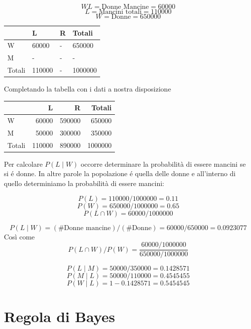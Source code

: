 \documentclass[onecolumn,12pt]{book}\usepackage[]{graphicx}\usepackage[]{color}
\newenvironment{knitrout}{}{} %
\begin{document}
$$WL =\textrm{Donne Mancine}=60000$$
$$L=\textrm{Mancini totali}= 110000$$
$$W=\textrm{Donne}= 650000$$
\begin{center}
\begin{knitrout}
\color{fgcolor}
\begin{tabular}{l|l|l|l}
\hline
  & L & R & Totali\\
\hline
W & 60000 & - & 650000\\
\hline
M & - & - & -\\
\hline
Totali & 110000 & - & 1000000\\
\hline
\end{tabular}


\end{knitrout}
\end{center}
Completando la tabella con i dati a nostra disposizione

\begin{center}
\begin{knitrout}
\color{fgcolor}
\begin{tabular}{l|r|r|r}
\hline
  & L & R & Totali\\
\hline
W & 60000 & 590000 & 650000\\
\hline
M & 50000 & 300000 & 350000\\
\hline
Totali & 110000 & 890000 & 1000000\\
\hline
\end{tabular}


\end{knitrout}
\end{center}

Per calcolare $P(L \mid  W)$  occorre determinare la probabilità di essere mancini se si é donne. In altre parole la popolazione é quella delle donne e all'interno di quello determiniamo  la probabilità di essere mancini:


$$P(L) = 110000/1000000=0.11$$
$$P(W)= 650000/1000000=0.65$$
$$P(L \cap  W) = 60000/1000000$$

$$P (L \mid W)=(\# \textrm{Donne mancine})/(\# \textrm{Donne})=60000/650000=0.0923077$$
Così come
$$P(L\cap W)/P(W)=\dfrac{60000/1000000}{650000/1000000}$$

 $$P (L \mid M)=50000/350000=0.1428571$$
 $$P (M \mid L)=50000/110000=0.4545455$$
 $$P (W \mid L)=1-0.1428571=0.5454545$$

\section{Regola di Bayes}
\end{document}
